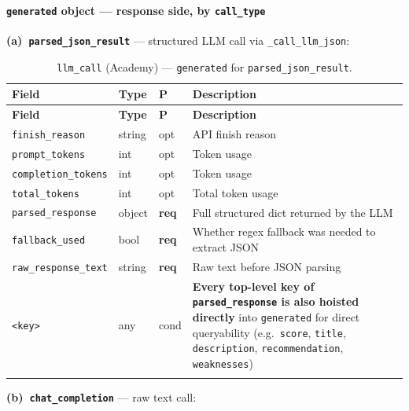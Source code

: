 \documentclass[11pt,a4paper]{article}
\newcommand{\opt}{\textcolor{optred}{opt}}
\newcommand{\cond}{\textcolor{condorange}{cond}}
\newcommand{\req}{\textbf{req}}
\newcommand{\subtype}[1]{\texttt{\textcolor{subtypeblue}{#1}}}
\begin{document}
\paragraph{\texttt{generated} object — response side, by \texttt{call\_type}}

\noindent\textbf{(a)~\texttt{parsed\_json\_result}} — structured LLM call via
\texttt{\_call\_llm\_json}:

\begin{longtable}{L{4cm} L{2.5cm} C{1.2cm} L{6.5cm}}
\toprule
\textbf{Field} & \textbf{Type} & \textbf{P} & \textbf{Description} \\
\midrule
\endfirsthead
\toprule \textbf{Field} & \textbf{Type} & \textbf{P} & \textbf{Description} \\
\midrule
\endhead
\bottomrule
\endlastfoot

\texttt{finish\_reason}      & string & \opt & API finish reason \\
\texttt{prompt\_tokens}      & int    & \opt & Token usage \\
\texttt{completion\_tokens}  & int    & \opt & Token usage \\
\texttt{total\_tokens}       & int    & \opt & Total token usage \\
\texttt{parsed\_response}    & object & \req & Full structured dict returned by the LLM \\
\texttt{fallback\_used}      & bool   & \req & Whether regex fallback was needed to extract JSON \\
\texttt{raw\_response\_text} & string & \req & Raw text before JSON parsing \\
\texttt{<key>}
  & any & \cond
  & \textbf{Every top-level key of \texttt{parsed\_response} is also hoisted
    directly} into \texttt{generated} for direct queryability
    (e.g.\ \texttt{score}, \texttt{title}, \texttt{description},
    \texttt{recommendation}, \texttt{weaknesses}) \\

\caption{\subtype{llm\_call} (Academy) — \texttt{generated} for \texttt{parsed\_json\_result}.}
\end{longtable}

\noindent\textbf{(b)~\texttt{chat\_completion}} — raw text call:
\end{document}
